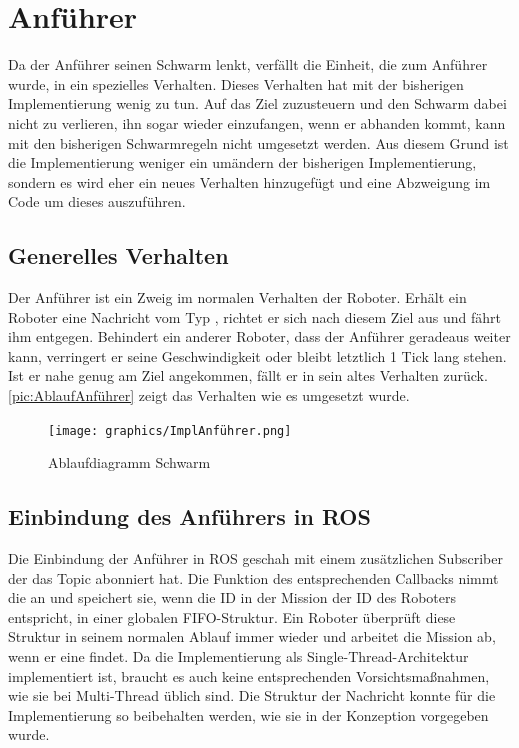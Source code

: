 \section{Anführer}

Da der Anführer seinen Schwarm lenkt, verfällt die Einheit, die zum Anführer wurde, in ein spezielles Verhalten. Dieses Verhalten hat mit der bisherigen Implementierung wenig zu tun. Auf das Ziel zuzusteuern und den Schwarm dabei nicht zu verlieren, ihn sogar wieder einzufangen, wenn er abhanden kommt, kann mit den bisherigen Schwarmregeln nicht umgesetzt werden. Aus diesem Grund ist die Implementierung weniger ein umändern der bisherigen Implementierung, sondern es wird eher ein neues Verhalten hinzugefügt und eine Abzweigung im Code um dieses auszuführen.

\subsection*{Generelles Verhalten}

Der Anführer ist ein Zweig im normalen Verhalten der Roboter. Erhält ein Roboter eine Nachricht vom Typ , richtet er sich nach diesem Ziel aus und fährt ihm entgegen. Behindert ein anderer Roboter, dass der Anführer geradeaus weiter kann, verringert er seine Geschwindigkeit oder bleibt letztlich 1 Tick lang stehen. Ist er nahe genug am Ziel angekommen, fällt er in sein altes Verhalten zurück.
\autoref{pic:AblaufAnführer} zeigt das Verhalten wie es umgesetzt wurde.

\begin{figure}
	\texttt{[image: graphics/ImplAnführer.png]}
	\caption{Ablaufdiagramm Schwarm}
	\label{pic:AblaufAnführer}
\end{figure}

\subsection*{Einbindung des Anführers in ROS}

Die Einbindung der Anführer in ROS geschah mit einem zusätzlichen Subscriber der das Topic  abonniert hat. Die Funktion des entsprechenden Callbacks nimmt die  an und speichert sie, wenn die ID in der Mission der ID des Roboters entspricht, in einer globalen FIFO-Struktur. Ein Roboter überprüft diese Struktur in seinem normalen Ablauf immer wieder und arbeitet die Mission ab, wenn er eine findet.
Da die Implementierung als Single-Thread-Architektur implementiert ist, braucht es auch keine entsprechenden Vorsichtsmaßnahmen, wie sie bei Multi-Thread üblich sind.
Die Struktur der Nachricht konnte für die Implementierung so beibehalten werden, wie sie in der Konzeption vorgegeben wurde.

